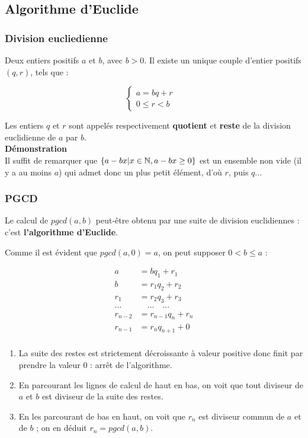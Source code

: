 \subsection{Algorithme d'Euclide}

\subsubsection{Division eucliedienne}
    Deux entiers positifs $a$ et $b$, avec $b > 0$.
    Il existe un unique couple d'entier positifs $(q, r)$, tels que :

    \[
        \begin{cases}
            a = bq + r &\\
            0 \le r < b
        \end{cases}
    \]
    
    Les entiers $q$ et $r$ sont appelés respectivement \textbf{quotient}
    et \textbf{reste} de la division euclidienne de $a$ par $b$.\\
    
    \noindent\textbf{Démonstration}\\
    \indent Il suffit de remarquer que 
    $\{ a - bx | x \in \mathbb N, a - bx \ge 0 \} $ est un ensemble non vide
    (il y a au moins $a$) qui admet donc un plus petit élément,
    d'où $r$, puis $q$...

\subsubsection{PGCD}
    Le calcul de $pgcd(a, b)$ peut-être obtenu par une suite de
    division euclidiennes : c'est \textbf{l'algorithme d'Euclide}.

    Comme il est évident que $pgcd(a, 0) = a$, on peut supposer
    $0 < b \le a$ :
    
    \begin{align*}
        a   &= bq_1 + r_1  \\
        b   &= r_1q_2 + r_2  \\
        r_1 &= r_2q_3 + r_3  \\
        \text{...} &\quad \text{...} \quad \text{...}  \\
        r_{n-2} &= r_{n-1}q_n + r_n  \\
        r_{n-1} &= r_nq_{n+1} + 0  \\
    \end{align*}
    
    \begin{enumerate}
        \item La suite des restes est strictement décroissante
            à valeur positive donc finit par prendre la valeur $0$ :
            arrêt de l'algorithme.
        \item En parcourant les lignes de calcul de haut en bas,
            on voit que tout diviseur de $a$ et $b$ est diviseur
            de la suite des restes.
        \item En les parcourant de bas en haut, on voit que
            $r_n$ est diviseur commun de $a$ et de $b$ ;
            on en déduit $r_n = pgcd(a,b)$.
    \end{enumerate}

